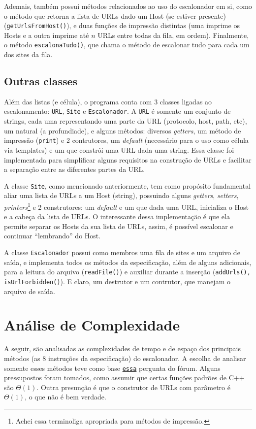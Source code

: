 \documentclass{article}
\def\code#1{\texttt{#1}}
\begin{document}
Ademais, também possui métodos relacionados ao uso do escalonador em si, como o método que retorna a lista de URLs dado um Host (se estiver presente) (\code{getUrlsFromHost()}), e duas funções de impressão distintas (uma imprime os Hosts e a outra imprime até \( n \) URLs entre todas da fila, em ordem). Finalmente, o método \code{escalonaTudo()}, que chama o método de escalonar tudo para cada um dos sites da fila.

\subsection{Outras classes}

Além das listas (e célula), o programa conta com 3 classes ligadas ao escalonamento: \code{URL}, \code{Site} e \code{Escalonador}. A \code{URL} é somente um conjunto de strings, cada uma representando uma parte da URL (protocolo, host, path, etc), um natural (a profundiade), e alguns métodos: diversos \textit{getters}, um método de impressão (\code{print}) e 2 contrutores, um \textit{default} (necessário para o uso como célula via templates) e um que constrói uma URL dada uma string. Essa classe foi implementada para simplificar alguns requisitos na construção de URLs e facilitar a separação entre as diferentes partes da URL.

A classe \code{Site}, como mencionado anteriormente, tem como propósito fundamental aliar uma lista de URLs a um Host (string), possuindo alguns \textit{getters}, \textit{setters}, \textit{printers}\footnote{Achei essa terminoliga apropriada para métodos de impressão.} e 2 construtores: um \textit{default} e um que dada uma URL, inicializa o Host e a cabeça da lista de URLs. O interessante dessa implementação é que ela permite separar os Hosts da sua lista de URLs, assim, é possível escalonar e continuar ``lembrando'' do Host.

A classe \code{Escalonador} possui como membros uma fila de sites e um arquivo de saída, e implementa todos os métodos da especificação, além de alguns adicionais, para a leitura do arquivo (\code{readFile()}) e auxiliar durante a inserção (\code{addUrls(), isUrlForbidden()}). E claro, um destrutor e um contrutor, que manejam o arquivo de saída.

\section{Análise de Complexidade}

A seguir, são analisadas as complexidades de tempo e de espaço dos principais métodos (as 8 instruções da especificação) do escalonador. A escolha de analisar somente esses métodos teve como base \href{https://virtual.ufmg.br/20212/mod/forum/discuss.php?d=31528}{\nolinkurl{essa}} pergunta do fórum. Alguns pressupostos foram tomados, como assumir que certas funções padrões de C++ são \(\Theta(1)\). Outra presunção é que o construtor de URLs com parâmetro é \( \Theta(1) \), o que não é bem verdade.
\end{document}

